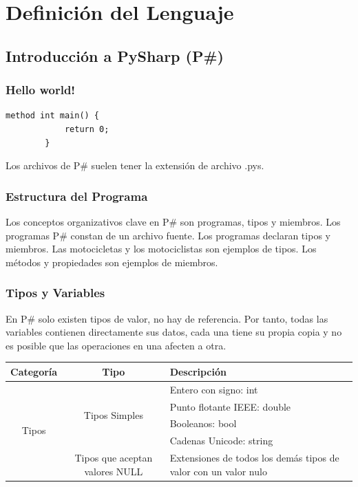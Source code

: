 \documentclass[12pt, letterpaper,spanish]{article}
\theoremstyle{definition}
\theoremstyle{remark}
\begin{document}
\newpage

\section{Definición del Lenguaje {\footnotesize \cite{conferenciasC}\cite{ullman}}}
	\subsection{Introducción a PySharp (P\#)}
	\subsubsection{Hello world!}
	
	\begin{lstlisting}[language={PySharp}]
		method int main() {
			return 0;
		}
	\end{lstlisting}	
	Los archivos de P\# suelen tener la extensión de archivo .pys.\par
	
	\subsubsection{Estructura del Programa}
	Los conceptos organizativos clave en P\# son programas, tipos y miembros. Los programas P\# constan de un archivo fuente. Los programas declaran tipos y miembros. Las motocicletas y los motociclistas son ejemplos de tipos. Los métodos y propiedades son ejemplos de miembros.
	
	\subsubsection{Tipos y Variables}
	En P\# solo existen tipos de valor, no hay de referencia. Por tanto, todas las variables contienen directamente sus datos, cada una tiene su propia copia y no es posible que las operaciones en una afecten a otra.\par
	\begin{center}
		\begin{tabular}{| c | c | m{5cm} | }
			\hline
			Categoría & Tipo & Descripción \\ \hline
			\multirow{5}{*}{Tipos} & \multirow{4}{*}{Tipos Simples} & Entero con signo: int \\ \cline{3-3}
			&  & Punto flotante IEEE: double \\ \cline{3-3}
			&  & Booleanos: bool \\ \cline{3-3}
			&  & Cadenas Unicode: string \\ \cline{2-3}
			& Tipos que aceptan valores NULL & Extensiones de todos los demás tipos de valor con un valor nulo \\ \hline
		\end{tabular}
	\end{center}
\end{document}
